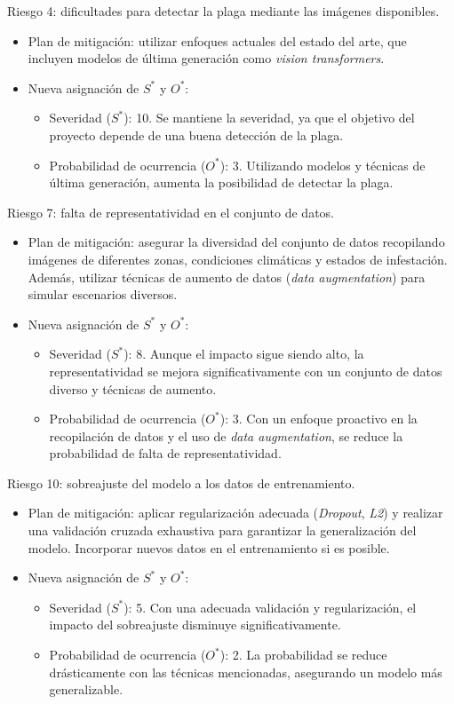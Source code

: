 \documentclass[
11pt, %
]{charter}
\begin{document}
Riesgo 4: dificultades para detectar la plaga mediante las imágenes disponibles.
\begin{itemize}
  \item Plan de mitigación: utilizar enfoques actuales del estado del arte, que incluyen modelos de última generación como \textit{vision transformers}.
  \item Nueva asignación de $S^*$ y $O^*$:
        \begin{itemize}
          \item Severidad ($S^*$): 10. Se mantiene la severidad, ya que el objetivo del proyecto depende de una buena detección de la plaga.
          \item Probabilidad de ocurrencia ($O^*$): 3. Utilizando modelos y técnicas de última generación, aumenta la posibilidad de detectar la plaga.
        \end{itemize}
\end{itemize}

Riesgo 7: falta de representatividad en el conjunto de datos.
\begin{itemize}
  \item Plan de mitigación: asegurar la diversidad del conjunto de datos recopilando imágenes de diferentes zonas, condiciones climáticas y estados de infestación. Además, utilizar técnicas de aumento de datos (\textit{data augmentation}) para simular escenarios diversos.
  \item Nueva asignación de $S^*$ y $O^*$:
        \begin{itemize}
          \item Severidad ($S^*$): 8. Aunque el impacto sigue siendo alto, la representatividad se mejora significativamente con un conjunto de datos diverso y técnicas de aumento. \item Probabilidad de ocurrencia ($O^*$): 3. Con un enfoque proactivo en la recopilación de datos y el uso de \textit{data augmentation}, se reduce la probabilidad de falta de representatividad. \end{itemize}
\end{itemize}

Riesgo 10: sobreajuste del modelo a los datos de entrenamiento.
\begin{itemize}
  \item Plan de mitigación: aplicar regularización adecuada (\textit{Dropout}, \textit{L2}) y realizar una validación cruzada exhaustiva para garantizar la generalización del modelo. Incorporar nuevos datos en el entrenamiento si es posible.
  \item Nueva asignación de $S^*$ y $O^*$:
        \begin{itemize}
          \item Severidad ($S^*$): 5. Con una adecuada validación y regularización, el impacto del sobreajuste disminuye significativamente.
          \item Probabilidad de ocurrencia ($O^*$): 2. La probabilidad se reduce drásticamente con las técnicas mencionadas, asegurando un modelo más generalizable.
        \end{itemize}
\end{itemize}
\end{document}
